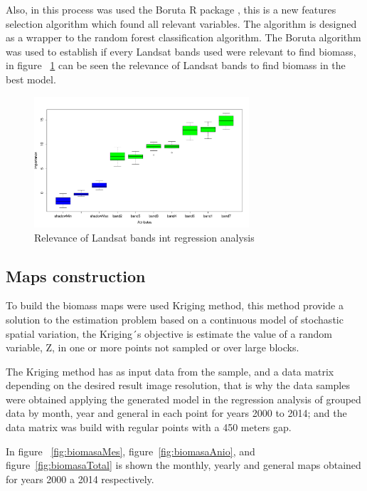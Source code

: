 Also, in this process was used the Boruta R package \cite{kursa2010feature}, this is a new features selection algorithm which found all relevant variables. The algorithm is designed as a wrapper to the random forest classification algorithm. The Boruta algorithm was used to establish if every Landsat bands used were relevant to find biomass, in figure ~\ref{fig:boruta} can be seen the relevance of Landsat bands to find biomass in the best model.

\begin{figure}
  \centering
  \includegraphics[width = 8cm]{boruta.pdf}
  \caption{Relevance of Landsat bands int regression analysis}
  \label{fig:boruta}
\end{figure}

\subsection{Maps construction}

To build the biomass maps were used Kriging method, this method provide a solution to the estimation problem based on a continuous model of stochastic spatial variation, the Kriging´s objective is estimate the value of a random variable, Z, in one or more points not sampled or over large blocks. 

The Kriging method has as input data from the sample, and a data matrix depending on the desired result image resolution, that is why the data samples were obtained applying the generated model in the regression analysis of grouped data by month, year and general in each point for years 2000 to 2014; and the data matrix was build with regular points with a 450 meters gap.
 
In figure ~\ref{fig:biomasaMes}, figure~\ref{fig:biomasaAnio}, and figure~\ref{fig:biomasaTotal}  is shown the monthly, yearly and general maps obtained for years 2000 a 2014 respectively. 
 
